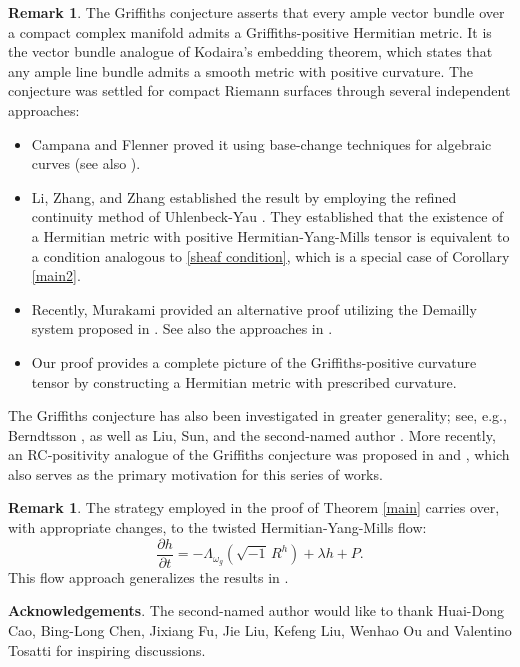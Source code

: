 \documentclass[12pt, reqno]{amsart}
\theoremstyle{plain}
\theoremstyle{definition}
\newtheorem{remark}[thm]{Remark}
\newcommand{\bremark}{\begin{remark}}
\newcommand{\eremark}{\end{remark}}
\newcommand{\beq}{\begin{equation}}
\newcommand{\eeq}{\end{equation}}
\renewcommand{\>}{\rightarrow}
\renewcommand{\>}{\rightarrow}
\numberwithin{equation}{section} %
\begin{document}
\bremark  The Griffiths conjecture asserts that every ample vector bundle over a compact complex manifold admits a Griffiths-positive Hermitian metric. It is the vector bundle analogue of Kodaira's embedding theorem, which states that any ample line bundle admits a smooth metric with positive curvature. The conjecture was settled for compact Riemann surfaces through several independent approaches:
\begin{itemize}
    \item Campana and Flenner \cite{CF90} proved it using base-change techniques for algebraic curves (see also \cite{Ume73}).

    \item Li, Zhang, and Zhang \cite{LZZ25} established the result by employing the refined continuity method of Uhlenbeck-Yau \cite{UY86}. They established that the existence of a Hermitian metric with positive Hermitian-Yang-Mills tensor is equivalent to a condition analogous to \eqref{sheaf condition}, which is a special case of Corollary \ref{main2}.

    \item Recently, Murakami \cite{Mur26} provided an alternative proof utilizing the Demailly system proposed in \cite{Dem21}. See also the approaches in \cite{Pin21}.

    \item Our proof provides a complete picture of the Griffiths-positive curvature tensor by constructing a  Hermitian metric with prescribed curvature.
\end{itemize}
 The Griffiths conjecture has also been investigated in greater generality; see, e.g., Berndtsson \cite{Ber09}, as well as Liu, Sun, and the second-named author \cite{LSY13}.  More recently, an RC‑positivity analogue of the Griffiths conjecture was proposed in \cite{Yang18} and  \cite{Yang20}, which also serves as the primary motivation for this series of works.
\eremark

\bremark 
The strategy employed in the proof of Theorem \ref{main} carries over, with appropriate changes, to the twisted Hermitian-Yang-Mills flow:
\beq \frac{\partial h}{\partial t} = -\Lambda_{\omega_g}\left(\sqrt{-1}\, R^h\right) +\lambda h+P. \eeq
This flow approach generalizes  the results in \cite{WYY26b+}.
\eremark
  \noindent\textbf{Acknowledgements}. The second-named author would like to thank Huai-Dong Cao,  Bing-Long Chen, Jixiang Fu, Jie Liu, Kefeng Liu, Wenhao Ou and Valentino Tosatti  for inspiring  discussions.

\baselineskip
\end{document}

